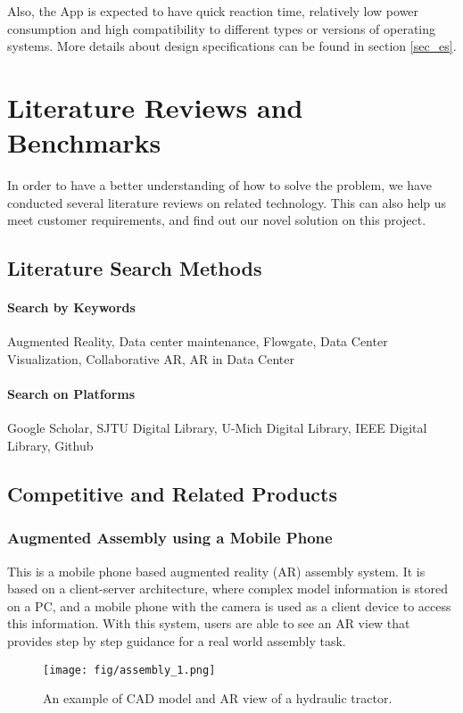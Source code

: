 \documentclass[11pt,a4paper]{article}
\begin{document}
\begin{onehalfspace}

Also, the App is expected to have quick reaction time, relatively low power consumption and high compatibility to different types or versions of operating systems. More details about design specifications can be found in section \ref{sec_es}.


\section{Literature Reviews and Benchmarks}
In order to have a better understanding of how to solve the problem, we have conducted several literature reviews on related technology. This can also help us meet customer requirements, and find out our novel solution on this project.

\subsection{Literature Search Methods}
\paragraph{Search by Keywords} Augmented Reality, Data center maintenance, Flowgate, Data Center Visualization, Collaborative AR, AR in Data Center
\paragraph{Search on Platforms} Google Scholar, SJTU Digital Library, U-Mich Digital Library, IEEE Digital Library, Github

\subsection{Competitive and Related Products}
\subsubsection{Augmented Assembly using a Mobile Phone~\cite{arAssembly}}
This is a mobile phone based augmented reality (AR) assembly system. It is based on a client-server architecture, where complex model information is stored on a PC, and a mobile phone with the camera is used as a client device to access this information. With this system, users are able to see an AR view that provides step by step guidance for a real world assembly task. 
\begin{figure}[H]
    \centering
    \texttt{[image: fig/assembly\_1.png]}
    \caption{An example of CAD model and AR view of a hydraulic tractor.}
    \label{fig:assembly1}
\end{figure}


\end{onehalfspace}
\end{document}
